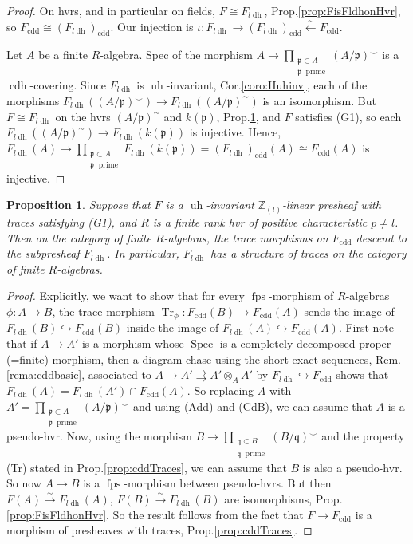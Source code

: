 \documentclass[10pt]{amsart}
\newtheorem{prop}[theo]{Proposition}
\theoremstyle{definition}
\newcommand{\p}{\mathfrak{p}}
\newcommand{\q}{\mathfrak{q}}
\newcommand{\ZZ}{\mathbb{Z}}
\DeclareMathOperator{\Spec}{Spec}
\DeclareMathOperator{\Tr}{Tr}
\newcommand{\Zll}{\ZZ_{(l)}}
\newcommand{\fps}{{\operatorname{fps}}}
\newcommand{\cdh}{{{\operatorname{cdh}}}}
\newcommand{\ldh}{{l{\operatorname{dh}}}}
\newcommand{\uh}{\operatorname{uh}}
\newcommand{\cdd}{{\operatorname{cdd}}}
\begin{document}
\begin{proof}
On hvrs, and in particular on fields, $F \cong F_\ldh$, Prop.\ref{prop:FisFldhonHvr}, so $F_\cdd \cong (F_\ldh)_\cdd$. Our injection is $\iota: F_\ldh \to (F_\ldh)_\cdd \stackrel{\sim}{\leftarrow} F_\cdd$.

Let $A$ be a finite $R$-algebra. Spec of the morphism $A \to \prod_{\substack{\p \subset A \\ \p\ \textrm{ prime}}} (A / \p)^\smallsmile$ is a $\cdh$-covering. Since $F_\ldh$ is $\uh$-invariant, Cor.\ref{coro:Huhinv}, each of the morphisms $F_\ldh((A / \p)^\smallsmile) \to F_\ldh((A / \p)^\sim)$ is an isomorphism. But $F \cong F_\ldh$ on the hvrs $(A / \p)^\sim$ and $k(\p)$, Prop.\ref{prop:ldhTraces}, and $F$ satisfies (G1), so each $F_\ldh((A / \p)^\sim) \to F_\ldh(k(\p))$ is injective. Hence, $F_\ldh(A) \to \prod_{\substack{\p \subset A \\ \p\ \textrm{ prime}}} F_\ldh(k(\p)) = (F_\ldh)_\cdd(A) \cong F_\cdd(A)$ is injective.
\end{proof}

\begin{prop} \label{prop:ldhTraces}
Suppose that $F$ is a $\uh$-invariant $\Zll$-linear presheaf with traces satisfying (G1), and $R$ is a finite rank hvr of positive characteristic $p \neq l$. Then on the category of finite $R$-algebras, the trace morphisms on $F_\cdd$ descend to the subpresheaf $F_\ldh$. In particular, $F_\ldh$ has a structure of traces on the category of finite $R$-algebras.
\end{prop}

\begin{proof}
Explicitly, we want to show that for every $\fps$-morphism of $R$-algebras $\phi: A \to B$, the trace morphism $\Tr_\phi: F_\cdd(B) \to F_\cdd(A)$ sends the image of $F_\ldh(B) \hookrightarrow F_\cdd(B)$ inside the image of $F_\ldh(A) \hookrightarrow F_\cdd(A)$. First note that if $A \to A'$ is a morphism whose $\Spec$ is a completely decomposed proper (=finite) morphism, then a diagram chase using the short exact sequences, Rem.\ref{rema:cddbasic}, %
associated to $A \to A' \rightrightarrows A' \otimes_A A'$ by $F_\ldh \hookrightarrow F_\cdd$ shows that $F_\ldh(A) = F_\ldh(A') \cap F_\cdd(A)$. So replacing $A$ with $A' = \prod_{\substack{\p \subset A \\ \p\ \textrm{ prime}}} (A / \p)^\smallsmile$ and using (Add) and (CdB), we can assume that $A$ is a pseudo-hvr. Now, using the morphism $B \to \prod_{\substack{\q \subset B \\ \q\ \textrm{ prime}}} (B / \q)^\smallsmile$ and the property (Tr) stated in Prop.\ref{prop:cddTraces}, we can assume that $B$ is also a pseudo-hvr. So now $A \to B$ is a $\fps$-morphism between pseudo-hvrs. But then $F(A) \stackrel{\sim}{\to} F_\ldh(A)$, $F(B) \stackrel{\sim}{\to} F_\ldh(B)$ are isomorphisms, Prop.\ref{prop:FisFldhonHvr}. So the result follows from the fact that $F \to F_\cdd$ is a morphism of presheaves with traces, Prop.\ref{prop:cddTraces}.
\end{proof}
\end{document}
